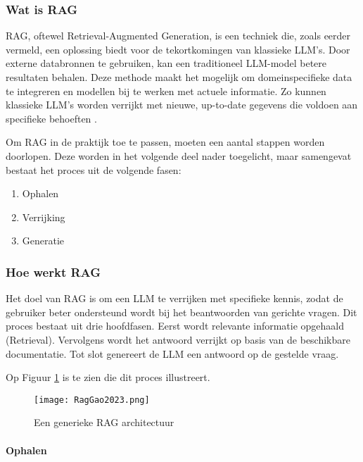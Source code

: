     \subsubsection{Wat is RAG}
    RAG, oftewel Retrieval-Augmented Generation, is een techniek die, zoals eerder vermeld, een oplossing biedt voor de tekortkomingen van klassieke LLM’s. Door externe databronnen te gebruiken, kan een traditioneel LLM-model betere resultaten behalen. Deze methode maakt het mogelijk om domeinspecifieke data te integreren en modellen bij te werken met actuele informatie. Zo kunnen klassieke LLM’s worden verrijkt met nieuwe, up-to-date gegevens die voldoen aan specifieke behoeften \autocite{Wu2024}.
    
    Om RAG in de praktijk toe te passen, moeten een aantal stappen worden doorlopen. Deze worden in het volgende deel nader toegelicht, maar samengevat bestaat het proces uit de volgende fasen:
    
    \begin{enumerate}
        \item {Ophalen}
        \item {Verrijking}
        \item {Generatie}
    \end{enumerate}
    
    \subsubsection{Hoe werkt RAG}
    
    Het doel van RAG is om een LLM te verrijken met specifieke kennis, zodat de gebruiker beter ondersteund wordt bij het beantwoorden van gerichte vragen. Dit proces bestaat uit drie hoofdfasen. Eerst wordt relevante informatie opgehaald (Retrieval). Vervolgens wordt het antwoord verrijkt op basis van de beschikbare documentatie. Tot slot genereert de LLM een antwoord op de gestelde vraag.
    
    Op Figuur \ref{fig:Rag process} is te zien die dit proces illustreert.
    
    \begin{figure}[H]
        \centering
        \texttt{[image: RagGao2023.png]}
        \caption{Een generieke RAG architectuur \cite{Gao2023}}
        \label{fig:Rag process}
    \end{figure}
    
    \paragraph{Ophalen}
   
